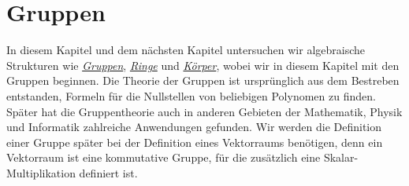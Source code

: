 \chapter{Gruppen}
In diesem Kapitel und dem nächsten Kapitel untersuchen wir algebraische Strukturen wie
\href{http://de.wikipedia.org/wiki/Gruppe_(Mathematik)}{\emph{Gruppen}}, 
\href{http://de.wikipedia.org/wiki/Ring_(Algebra)}{\emph{Ringe}}
 und 
\href{http://en.wikipedia.org/wiki/Field_(mathematics)}{\emph{Körper}}, 
wobei wir in diesem Kapitel mit den Gruppen beginnen.
Die Theorie der Gruppen ist ursprünglich aus dem Bestreben entstanden, Formeln für die
Nullstellen von beliebigen Polynomen zu finden.  Später hat die Gruppentheorie auch in
anderen Gebieten der Mathematik, Physik und Informatik zahlreiche Anwendungen gefunden.
Wir werden die Definition einer Gruppe später bei der Definition eines Vektorraums benötigen, 
denn ein Vektorraum ist eine kommutative Gruppe, für die zusätzlich eine Skalar-Multiplikation
definiert ist.

